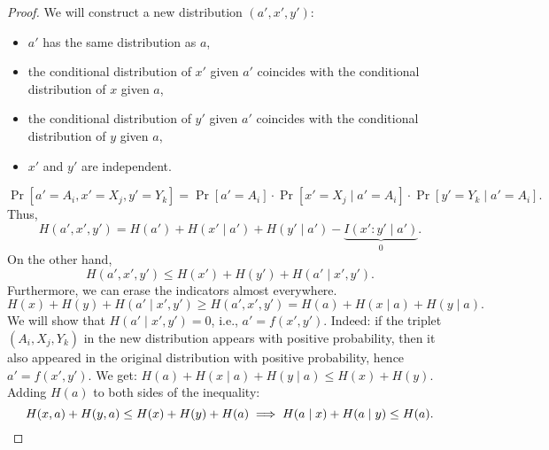 \documentclass[12pt,sans]{article}
\theoremstyle{definition}
\theoremstyle{plain}
\theoremstyle{remark}
\begin{document}
\begin{proof}
    We will construct a new distribution \((a', x', y')\):
    \begin{itemize}
        \item \(a'\) has the same distribution as \(a\),
        \item the conditional distribution of \(x'\) given \(a'\) coincides
            with the conditional distribution of \(x\) given \(a\),
        \item the conditional distribution of \(y'\) given \(a'\) coincides
            with the conditional distribution of \(y\) given \(a\),
        \item \(x'\) and \(y'\) are independent.
    \end{itemize}
    \[
    \Pr[a' = A_i, x' = X_j, y' = Y_k] =
    \Pr[a' = A_i] \cdot \Pr[x' = X_j \mid a' = A_i] \cdot \Pr[y' = Y_k \mid a' = A_i].
    \]
    Thus,
    \[
        H(a', x', y') = H(a') + H(x' \mid a') + H(y' \mid a') - \underbrace{I(x' : y' \mid a')}_{0}.
    \]
    On the other hand,
    \[
        H(a', x', y') \le H(x') + H(y') + H(a' \mid x', y').
    \]
    Furthermore, we can erase the indicators almost everywhere.
    \[
        H(x) + H(y) + H(a' \mid x', y') \ge H(a', x', y') = H(a) + H(x \mid a) + H(y \mid a).
    \]
    We will show that \(H(a' \mid x', y') = 0\), i.e., \(a' = f(x', y')\). Indeed:
    if the triplet \((A_i, X_j, Y_k)\) in the new distribution appears with positive
    probability, then it also appeared in the original distribution with positive
    probability, hence \(a' = f(x', y')\).
    We get: \(H(a) + H(x \mid a) + H(y \mid a) \le H(x) + H(y)\). Adding \(H(a)\) to both sides of the inequality:
    \[
       H(x, a) + H(y, a) \le H(x) + H(y) + H(a) \implies H(a \mid x) + H(a \mid y) \le H(a). \qedhere
    \]
\end{proof}
\end{document}
